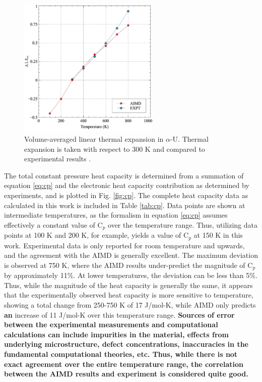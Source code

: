 \documentclass[utf8]{frontiersSCNS} %
\providecommand{\DIFaddtex}[1]{{\bf #1}} %
\providecommand{\DIFdeltex}[1]{} %
\providecommand{\DIFaddbegin}{\protect\color{blue}} %
\providecommand{\DIFaddend}{\protect\color{black}} %
\providecommand{\DIFdelbegin}{\protect\color{red}} %
\providecommand{\DIFdelend}{\protect\color{black}} %
\providecommand{\DIFadd}[1]{\texorpdfstring{\DIFaddtex{#1}}{#1}} %
\providecommand{\DIFdel}[1]{\texorpdfstring{\DIFdeltex{#1}}{}} %
\begin{document}
 \begin{figure}[hbt]
	\centering
	\includegraphics[width=0.6\textwidth]{vte.jpg}
  \caption{Volume-averaged linear thermal expansion in $\alpha$-U. Thermal expansion is taken with respect to 300 K and compared to experimental results \cite{touloukian}.}\label{fig:vol}
\end{figure}

The total constant pressure heat capacity is determined from a summation of equation \ref{eq:cp} and the electronic heat capacity contribution as determined by experiments, and is plotted in Fig. \ref{fig:cp}. The complete heat capacity data as calculated in this work is included in Table \ref{tab:cp}. Data points are shown at intermediate temperatures, as the formalism in equation \ref{eq:cp} assumes effectively a constant value of C$_p$ over the temperature range. Thus, utilizing data points at 100 K and 200 K, for example, yields a value of C$_p$ at 150 K in this work. Experimental data is only reported for room temperature and upwards, and the agreement with the AIMD is generally excellent. The maximum deviation is observed at 750 K, where the AIMD results under-predict the magnitude of C$_p$ by approximately 11\%. At lower temperatures, the deviation can be less than 5\%. Thus, while the magnitude of the heat capacity is generally the same, it appears that the experimentally observed heat capacity is more sensitive to temperature, showing a total change from 250-750 K of 17 J/mol-K, while AIMD only predicts \DIFdelbegin \DIFdel{at }\DIFdelend \DIFaddbegin \DIFadd{an }\DIFaddend increase of 11 J/mol-K over this temperature range. \DIFaddbegin \DIFadd{Sources of error between the experimental measurements and computational calculations can include impurities in the material, effects from underlying microstructure, defect concentrations, inaccuracies in the fundamental computational theories, etc. Thus, while there is not exact agreement over the entire temperature range, the correlation between the AIMD results and experiment is considered quite good. 
}\DIFaddend 
\end{document}
